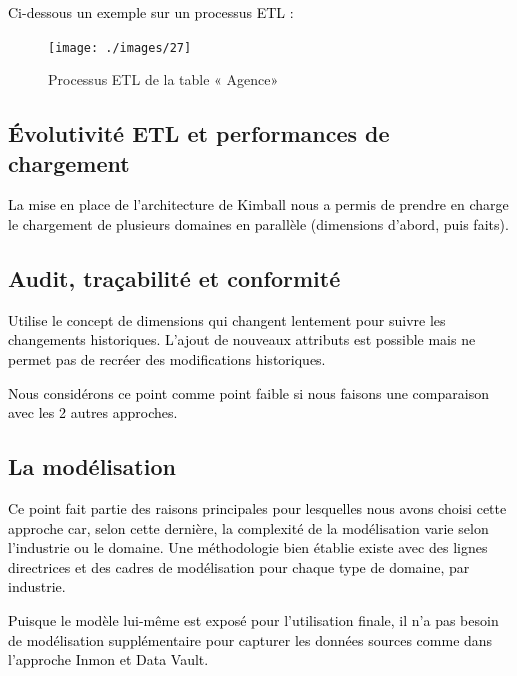 \documentclass[a4paper,12pt]{report}
\begin{document}
\textcolor{black}{Ci-dessous un exemple sur un processus ETL :}


\begin{figure}[H]

\begin{center}
\texttt{[image: ./images/27]}
\end{center}

\caption{Processus ETL de la table « Agence»}
\label{fig:1}

\end{figure}

\subsection{Évolutivité ETL et performances de chargement  }
\textcolor{black}{La mise en place de l'architecture de Kimball nous a permis de prendre en charge le chargement de plusieurs domaines en parallèle (dimensions d'abord, puis faits). }


\subsection{Audit, traçabilité et conformité   }
\textcolor{black}{Utilise le concept de dimensions qui changent lentement pour suivre les changements historiques. L’ajout de nouveaux attributs est possible mais ne permet pas de recréer des modifications historiques.}

\textcolor{black}{Nous considérons ce point comme point faible si nous faisons une comparaison avec les 2 autres approches.}

\subsection{La modélisation  }
\textcolor{black}{Ce point fait partie des raisons principales pour lesquelles nous avons choisi cette approche car,  selon cette dernière, la complexité de la modélisation varie selon l'industrie ou le domaine. Une méthodologie bien établie existe avec des lignes directrices et des cadres de modélisation pour chaque type de domaine, par industrie. }

\textcolor{black}{ Puisque le modèle lui-même est exposé pour l’utilisation finale, il n'a pas besoin de modélisation supplémentaire pour capturer les données sources comme dans l'approche Inmon et Data Vault.}
\end{document}
